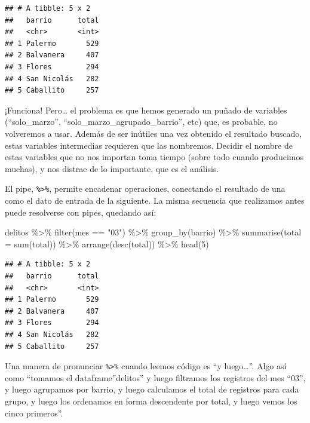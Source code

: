\documentclass[
]{book}
\newenvironment{Shaded}{\begin{snugshade}}{\end{snugshade}}
\newcommand{\AttributeTok}[1]{\textcolor[rgb]{0.77,0.63,0.00}{#1}}
\newcommand{\DecValTok}[1]{\textcolor[rgb]{0.00,0.00,0.81}{#1}}
\newcommand{\FunctionTok}[1]{\textcolor[rgb]{0.00,0.00,0.00}{#1}}
\newcommand{\NormalTok}[1]{#1}
\newcommand{\SpecialCharTok}[1]{\textcolor[rgb]{0.00,0.00,0.00}{#1}}
\newcommand{\StringTok}[1]{\textcolor[rgb]{0.31,0.60,0.02}{#1}}
\begin{document}
\begin{verbatim}
## # A tibble: 5 x 2
##   barrio      total
##   <chr>       <int>
## 1 Palermo       529
## 2 Balvanera     407
## 3 Flores        294
## 4 San Nicolás   282
## 5 Caballito     257
\end{verbatim}

¡Funciona! Pero\ldots{} el problema es que hemos generado un puñado de variables (``solo\_marzo'', ``solo\_marzo\_agrupado\_barrio'', etc) que, es probable, no volveremos a usar. Además de ser inútiles una vez obtenido el resultado buscado, estas variables intermedias requieren que las nombremos. Decidir el nombre de estas variables que no nos importan toma tiempo (sobre todo cuando producimos muchas), y nos distrae de lo importante, que es el análisis.

El pipe, \texttt{\%\textgreater{}\%}, permite encadenar operaciones, conectando el resultado de una como el dato de entrada de la siguiente. La misma secuencia que realizamos antes puede resolverse con pipes, quedando así:

\begin{Shaded}
\begin{Highlighting}[]
\NormalTok{delitos }\SpecialCharTok{\%\textgreater{}\%} 
    \FunctionTok{filter}\NormalTok{(mes }\SpecialCharTok{==} \StringTok{"03"}\NormalTok{) }\SpecialCharTok{\%\textgreater{}\%} 
    \FunctionTok{group\_by}\NormalTok{(barrio) }\SpecialCharTok{\%\textgreater{}\%} 
    \FunctionTok{summarise}\NormalTok{(}\AttributeTok{total =} \FunctionTok{sum}\NormalTok{(total)) }\SpecialCharTok{\%\textgreater{}\%} 
    \FunctionTok{arrange}\NormalTok{(}\FunctionTok{desc}\NormalTok{(total)) }\SpecialCharTok{\%\textgreater{}\%} 
    \FunctionTok{head}\NormalTok{(}\DecValTok{5}\NormalTok{)}
\end{Highlighting}
\end{Shaded}

\begin{verbatim}
## # A tibble: 5 x 2
##   barrio      total
##   <chr>       <int>
## 1 Palermo       529
## 2 Balvanera     407
## 3 Flores        294
## 4 San Nicolás   282
## 5 Caballito     257
\end{verbatim}

Una manera de pronunciar \texttt{\%\textgreater{}\%} cuando leemos código es ``y luego\ldots{}''. Algo así como ``tomamos el dataframe''delitos'' y luego filtramos los registros del mes ``03'', y luego agrupamos por barrio, y luego calculamos el total de registros para cada grupo, y luego los ordenamos en forma descendente por total, y luego vemos los cinco primeros''.
\end{document}
